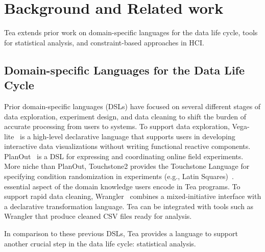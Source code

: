 \section{Background and Related work}
Tea extends prior work on domain-specific languages for the data life cycle, 
tools for statistical analysis, and constraint-based approaches in HCI. 

\vspace{-6pt}
\subsection{Domain-specific Languages for the Data Life Cycle}
Prior domain-specific languages (DSLs) have focused on several different stages
of data exploration, experiment design, and data cleaning to shift the burden of
accurate processing from users to systems. To support data exploration,
Vega-lite~\cite{satyanarayan2017vega} is a high-level declarative language that
supports users in developing interactive data visualizations without writing
functional reactive components. PlanOut~\cite{bakshy2014planout} is a DSL for
expressing and coordinating online field experiments. More niche than PlanOut,
Touchstone2 provides the Touchstone Language for specifying condition
randomization in experiments (e.g., Latin
Squares)~\cite{eiselmayer2019touchstone2}.%
essential aspect of the domain knowledge users encode in Tea programs. To
support rapid data cleaning,  Wrangler~\cite{kandel2011wrangler} combines a
mixed-initiative interface with a declarative transformation language. Tea can
be integrated with tools such as Wrangler that produce cleaned CSV files ready
for analysis.

In comparison to these previous DSLs, Tea provides a language to support another crucial step in the data life cycle: statistical analysis. 


\vspace{-13pt}
